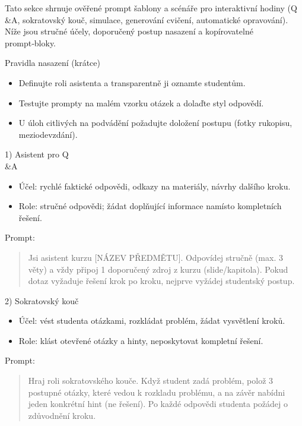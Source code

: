 Tato sekce shrnuje ověřené prompt šablony a scénáře pro interaktivní hodiny (Q\\ \&A, sokratovský kouč, simulace, generování cvičení, automatické opravování). Níže jsou stručné účely, doporučený postup nasazení a kopírovatelné prompt‑bloky.

Pravidla nasazení (krátce)
\begin{itemize}
  \item Definujte roli asistenta a transparentně ji oznamte studentům.
  \item Testujte prompty na malém vzorku otázek a dolaďte styl odpovědí.
  \item U úloh citlivých na podvádění požadujte doložení postupu (fotky rukopisu, meziodevzdání). \cite{kb_ai_101_tipu_pdf_04e4a115_page_8_1}
\end{itemize}

1) Asistent pro Q\\ \&A
\begin{itemize}
  \item Účel: rychlé faktické odpovědi, odkazy na materiály, návrhy dalšího kroku.
  \item Role: stručné odpovědi; žádat doplňující informace namísto kompletních řešení.
\end{itemize}
Prompt:
\begin{quote}
\begin{PromptBlock}

Jsi asistent kurzu [NÁZEV PŘEDMĚTU]. Odpovídej stručně (max. 3 věty) a vždy připoj 1 doporučený zdroj z kurzu (slide/kapitola). Pokud dotaz vyžaduje řešení krok po kroku, nejprve vyžádej studentský postup.
\end{PromptBlock}

\end{quote}

2) Sokratovský kouč
\begin{itemize}
  \item Účel: vést studenta otázkami, rozkládat problém, žádat vysvětlení kroků.
  \item Role: klást otevřené otázky a hinty, neposkytovat kompletní řešení.
\end{itemize}
Prompt:
\begin{quote}
\begin{PromptBlock}

Hraj roli sokratovského kouče. Když student zadá problém, polož 3 postupné otázky, které vedou k rozkladu problému, a na závěr nabídni jeden konkrétní hint (ne řešení). Po každé odpovědi studenta požádej o zdůvodnění kroku.
\end{PromptBlock}

\end{quote}

